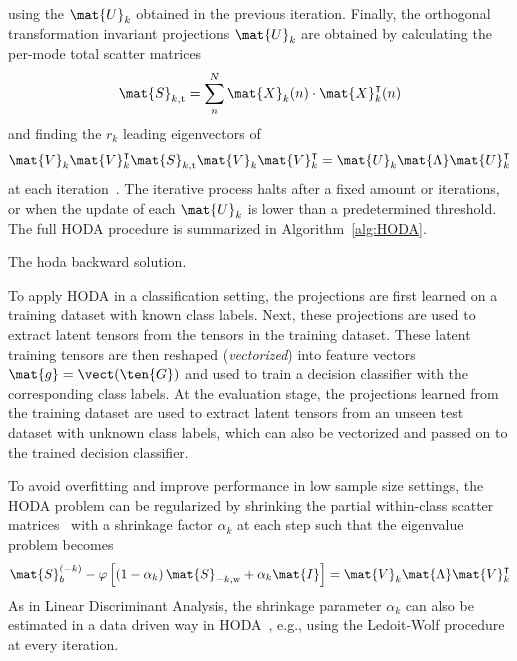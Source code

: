 using the $\mat{U}_k$ obtained in the previous iteration.
Finally, the orthogonal transformation invariant projections $\mat{U}_k$
are obtained by calculating the
per-mode total scatter matrices
\begin{equation}
  \mat{S}_{k,\text{t}} = \sum_n^N\mat{X}_k(n)\cdot\mat{X}_k^\intercal(n)
\end{equation}
and finding the $r_k$ leading eigenvectors of
\begin{equation}
	\mat{V}_k\mat{V}_k^\intercal\mat{S}_{k,\text{t}}\mat{V}_k\mat{V}_k^\intercal
	= \mat{U}_k\mat{\Lambda}\mat{U}_k^\intercal
\end{equation}
at each iteration~\cite{Wang2007}.
The iterative process halts after a fixed amount or iterations, or when the
update of each $\mat{U}_k$ is lower than a predetermined threshold.
The full HODA procedure is summarized in Algorithm~\ref{alg:HODA}.
\begin{algorithm}
  \caption[The \ac{hoda} backward solution.]{The \ac{hoda} backward solution.}
	\label{alg:HODA}
	
\end{algorithm}


To apply HODA in a classification setting, the projections
are first learned on a training dataset  with known class labels.
Next, these projections are used to extract latent tensors from the
tensors in the training dataset.
These latent training tensors are then reshaped (\emph{vectorized}) into feature vectors
$\mat{g} =  \vect(\ten{G})$ and used to train a decision classifier with the corresponding class labels.
At the evaluation stage, the projections learned from the training dataset are
used to extract latent tensors from an unseen test dataset with unknown class
labels, which can also be vectorized and passed on to the trained decision
classifier.

To avoid overfitting and improve performance in low sample size settings, the
HODA problem can be regularized by shrinking the partial
within-class scatter matrices~\cite{Phan2010} with a shrinkage factor
$\alpha_k$ at each step such that the eigenvalue problem becomes
\begin{equation}
	\mat{S}_b^{(-k)} -
	\varphi\left[\left(1-\alpha_k\right)\mat{S}_{-k,\text{w}}+\alpha_k\mat{I}\right] =
	\mat{V}_k\mat{\Lambda}\mat{V}_k^\intercal
\end{equation}
As in Linear Discriminant Analysis, the shrinkage parameter $\alpha_k$ can
also be estimated in a data driven way in HODA~\cite{Jorajuria2022},
e.g., using the Ledoit-Wolf procedure~\cite{Ledoit2003} at every iteration.


